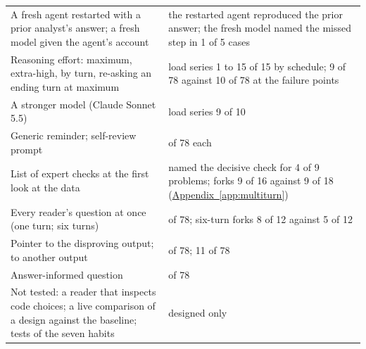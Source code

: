 \documentclass[10pt]{article}
\newcommand{\aref}[1]{\hyperref[#1]{Appendix~\ref*{#1}}}
\begin{document}
\begin{small}
\begin{longtable}{@{}>{\raggedright\arraybackslash}p{5.2cm}>{\raggedright\arraybackslash}p{10.6cm}@{}}
A fresh agent restarted with a prior analyst's answer; a fresh model given the agent's account & the restarted agent reproduced the prior answer; the fresh model named the missed step in 1 of 5 cases\\
Reasoning effort: maximum, extra-high, by turn, re-asking an ending turn at maximum & load series 1 to 15 of 15 by schedule; 9 of 78 against 10 of 78 at the failure points\\
A stronger model (Claude Sonnet 5.5) & load series 9 of 10\\
Generic reminder; self-review prompt & 11 of 78 each\\
List of expert checks at the first look at the data & named the decisive check for 4 of 9 problems; forks 9 of 16 against 9 of 18 (\aref{app:multiturn})\\
Every reader's question at once (one turn; six turns) & 15 of 78; six-turn forks 8 of 12 against 5 of 12\\
Pointer to the disproving output; to another output & 51 of 78; 11 of 78\\
Answer-informed question & 67 of 78\\
Not tested: a reader that inspects code choices; a live comparison of a design against the baseline; tests of the seven habits & designed only\\
\bottomrule
\end{longtable}
\end{small}
\end{document}
